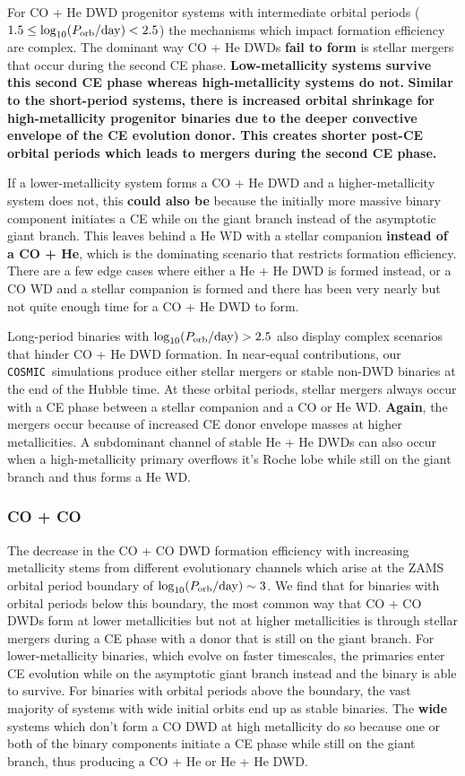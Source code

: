 \documentclass[twocolumn, linenumbers]{aastex631}
\newcommand{\cosmic}{\texttt{COSMIC}}
\begin{document}
For CO + He DWD progenitor systems with intermediate orbital periods ($1.5\leq \log_{10}(P_{\rm{orb}}/\rm{day})< 2.5$) the mechanisms which impact formation efficiency are complex. The dominant way CO + He DWDs \textbf{fail to form} is stellar mergers that occur during the second CE phase. \textbf{Low-metallicity systems survive this second CE phase whereas high-metallicity systems do not.} \textbf{Similar to the short-period systems, there is increased orbital shrinkage for high-metallicity progenitor binaries due to the deeper convective envelope of the CE evolution donor. This creates shorter post-CE orbital periods which leads to mergers during the second \textbf{CE} phase.}

If a lower-metallicity system forms a CO + He DWD and a higher-metallicity system does not, this \textbf{could also be} because the initially more massive binary component initiates a CE while on the giant branch instead of the asymptotic giant branch. This leaves behind a He WD with a stellar companion \textbf{instead of a CO + He}, which is the dominating scenario that restricts formation efficiency. There are a few edge cases where either a He + He DWD is formed instead, or a CO WD and a stellar companion is formed and there has been very nearly but not quite enough time for a CO + He DWD to form. 

Long-period binaries with $\log_{10}(P_{\rm{orb}}/\rm{day})>2.5$ also display complex scenarios that hinder CO + He DWD formation. In near-equal contributions, our \cosmic\ simulations produce either stellar mergers or stable non-DWD binaries at the end of the Hubble time. At these orbital periods, stellar mergers always occur with a CE phase between a stellar companion and a CO or He WD. \textbf{Again}, the mergers occur because of increased CE donor envelope masses at higher metallicities. A subdominant channel of stable He + He DWDs can also occur when a high-metallicity primary overflows it's Roche lobe while still on the giant branch and thus forms a He WD.

\subsubsection{\textbf{CO + CO}}\label{formeff_COCO}
The decrease in the CO + CO DWD formation efficiency with increasing metallicity stems from different evolutionary channels which arise at the ZAMS orbital period boundary of $\log_{10}(P_{\rm{orb}}/\rm{day})\sim3$. We find that for binaries with orbital periods below this boundary, the most common way that CO + CO DWDs form at lower metallicities but not at higher metallicities is through stellar mergers during a CE phase with a donor that is still on the giant branch. For lower-metallicity binaries, which evolve on faster timescales, the primaries enter CE evolution while on the asymptotic giant branch instead and the binary is able to survive. For binaries with orbital periods above the boundary, the vast majority of systems with wide initial orbits end up as stable binaries. The \textbf{wide} systems which don’t form a CO DWD at high metallicity do so because one or both of the binary components initiate a CE phase while still on the giant branch, thus producing a CO + He or He + He DWD. 
\end{document}
